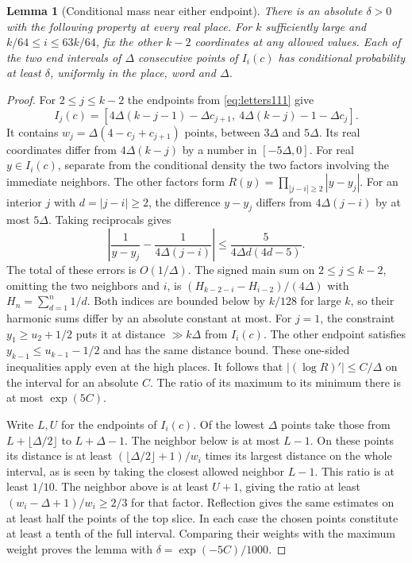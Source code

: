 \documentclass[a4paper,11pt]{article}
\newtheorem{lemma}[proposition]{Lemma}
\theoremstyle{definition}
\theoremstyle{remark}
\numberwithin{equation}{section}
\begin{document}
\begin{lemma}[Conditional mass near either endpoint]\label{lem:end134}
There is an absolute \(\delta>0\) with the following property
at every real place. For \(k\) sufficiently large and
\(k/64\le i\le 63k/64\), fix the other \(k-2\) coordinates at
any allowed values. Each of the two end intervals of \(\Delta\)
consecutive points of \(I_i(c)\) has conditional probability at
least \(\delta\), uniformly in the place, word and \(\Delta\).
\end{lemma}
\begin{proof}
For \(2\le j\le k-2\) the endpoints from \eqref{eq:letters111}
give
\[
 I_j(c)=[4\Delta(k-j-1)-\Delta c_{j+1},\
               4\Delta(k-j)-1-\Delta c_j].
\]
It contains \(w_j=\Delta(4-c_j+c_{j+1})\) points, between
\(3\Delta\) and \(5\Delta\). Its real coordinates differ from
\(4\Delta(k-j)\) by a number in \([-5\Delta,0]\). For real
\(y\in I_i(c)\), separate from the conditional density the two
factors involving the immediate neighbors. The other factors
form \(R(y)=\prod_{|j-i|\ge2}|y-y_j|\). For an interior \(j\)
with \(d=|j-i|\ge2\), the difference \(y-y_j\) differs from
\(4\Delta(j-i)\) by at most \(5\Delta\). Taking reciprocals gives
\[
 \left|\frac1{y-y_j}-\frac1{4\Delta(j-i)}\right|
 \le \frac{5}{4\Delta d(4d-5)} .
\]
The total of these errors is \(O(1/\Delta)\). The signed main
sum on \(2\le j\le k-2\), omitting the two neighbors and \(i\),
is \((H_{k-2-i}-H_{i-2})/(4\Delta)\) with
\(H_n=\sum_{d=1}^n 1/d\). Both indices are bounded below by
\(k/128\) for large \(k\), so their harmonic sums differ by an
absolute constant at most. For \(j=1\), the constraint
\(y_1\ge u_2+1/2\) puts it at distance \(\gg k\Delta\) from
\(I_i(c)\). The other endpoint satisfies
\(y_{k-1}\le u_{k-1}-1/2\) and has the same distance bound.
These one-sided inequalities apply even at the high places.
It follows that \(|(\log R)'|\le C/\Delta\) on the interval for
an absolute \(C\). The ratio of its maximum to its minimum there
is at most \(\exp(5C)\).

Write \(L,U\) for the endpoints of \(I_i(c)\). Of the lowest
\(\Delta\) points take those from \(L+\lfloor\Delta/2\rfloor\)
to \(L+\Delta-1\). The neighbor below is at most \(L-1\).
On these points its distance is at least
\((\lfloor\Delta/2\rfloor+1)/w_i\) times its largest distance
on the whole interval, as is seen by taking the closest allowed
neighbor \(L-1\). This ratio is at least \(1/10\).
The neighbor above is at least \(U+1\), giving the ratio at
least \((w_i-\Delta+1)/w_i\ge 2/3\) for that factor. Reflection
gives the same estimates on at least half the points of the top
slice. In each case the chosen points constitute at least a
tenth of the full interval. Comparing their weights with the
maximum weight proves the lemma with
\(\delta=\exp(-5C)/1000\).
\end{proof}
\end{document}
